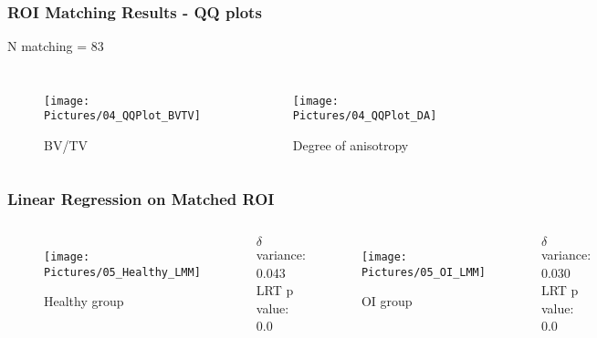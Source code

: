 \documentclass[xcolor=table]{beamer}
\begin{document}
\begin{frame}
	\frametitle{ROI Matching Results - QQ plots}
	N matching = 83
	\begin{columns}
		\centering
		\begin{figure}
			\texttt{[image: Pictures/04\_QQPlot\_BVTV]}
			\caption{BV/TV}
		\end{figure}
		\centering
		\begin{figure}
			\texttt{[image: Pictures/04\_QQPlot\_DA]}
			\caption{Degree of anisotropy}
		\end{figure}
	\end{columns}
\end{frame}



\begin{frame}
	\frametitle{Linear Regression on Matched ROI}
	\begin{columns}
		\column[c]{0.45\linewidth}
		\centering
		\begin{figure}
			\texttt{[image: Pictures/05\_Healthy\_LMM]}
			\caption{Healthy group}
		\end{figure}
		$\delta$ variance: 0.043\\
		LRT p value: 0.0
		\column[c]{0.45\linewidth}
		\centering
		\begin{figure}
			\texttt{[image: Pictures/05\_OI\_LMM]}
			\caption{OI group}
		\end{figure}
		$\delta$ variance: 0.030\\
		LRT p value: 0.0
	\end{columns}
\end{frame}
\end{document}
